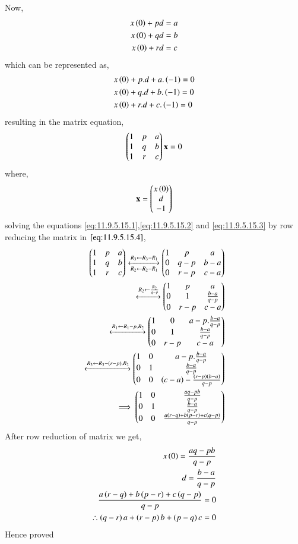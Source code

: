 \documentclass[journal,12pt,onecolumn]{IEEEtran}
\theoremstyle{remark}
\begin{document}
Now,
\begin{align}
    x\left(0\right)+pd &= a \label{eq:11.9.5.15.1} \\
    x\left(0\right)+qd &= b \label{eq:11.9.5.15.2} \\
    x\left(0\right)+rd &= c \label{eq:11.9.5.15.3} 
\end{align}
which can be represented as,
\begin{align}
    &x\left(0\right)+p.d+a.\left(-1\right)=0\\
    &x\left(0\right)+q.d+b.\left(-1\right)=0\\
    &x\left(0\right)+r.d+c.\left(-1\right)=0
\end{align}
resulting in the matrix equation,
\begin{align}
    \begin{pmatrix}1&p&a\\1&q&b\\1&r&c\\\end{pmatrix}\mathbf{x}=0\label{eq:11.9.5.15.4}
\end{align}
where,
\begin{align}
    \mathbf{x}=\begin{pmatrix}x\left(0\right)\\d\\-1\end{pmatrix}
\end{align}
solving the equations \eqref{eq:11.9.5.15.1},\eqref{eq:11.9.5.15.2} and \eqref{eq:11.9.5.15.3} by row reducing the matrix in $\eqref{eq:11.9.5.15.4}$,
    \begin{align}
    \begin{pmatrix}
        1&p&a\\
        1&q&b\\
        1&r&c\\
    \end{pmatrix}
    \xleftrightarrow[R_{2}\leftarrow R_2 - R_1]{ R_{3}\leftarrow R_3 - R_1}
    \begin{pmatrix}
        1&p&a\\
        0&q-p&b-a\\
        0&r-p&c-a\\
    \end{pmatrix}\\
   \xleftrightarrow{R_{2}\leftarrow \frac{R_2}{q-p}} 
    \begin{pmatrix}
        1&p&a\\
        0&1&\frac{b-a}{q-p}\\
        0&r-p&c-a\\
    \end{pmatrix}\\
    \xleftrightarrow{R_1\leftarrow R_1 - p.R_2}
    \begin{pmatrix}
       1&0&a- p. \frac{b-a}{q-p}\\
       0&1&\frac{b-a}{q-p}\\
       0&r-p&c-a\\
    \end{pmatrix}\\
    \xleftrightarrow{R_{3}\leftarrow R_{3}-\ensuremath{\left(r-p\right)}.R_2}
    \begin{pmatrix}
       1&0&a- p. \frac{b-a}{q-p}\\
       0&1&\frac{b-a}{q-p}\\
       0&0&\left(c-a\right) - \frac{\left(r-p\right)\left(b-a\right)}{q-p}\\
    \end{pmatrix}\\
    \implies
    \begin{pmatrix}
          1&0&\frac{aq-pb}{q-p}\\
       0&1&\frac{b-a}{q-p}\\
       0&0&\frac{a\left(r-q\right) + b\left(p-r\right) + c\left(q-p\right)}{q-p}\\
    \end{pmatrix}
\end{align}
After row reduction of matrix we get,
\begin{align}
    x\left(0\right)=\frac{aq-pb}{q-p}\\
    d=\frac{b-a}{q-p}\\
    \frac{a\left(r-q\right) + b\left(p-r\right) + c\left(q-p\right)}{q-p}=0\\
    \therefore{\ensuremath{\left(q-r\right)}a + \ensuremath{\left(r-p\right)}b +\ensuremath{\left(p-q\right)}c =0}
\end{align}
Hence proved
\end{document}
